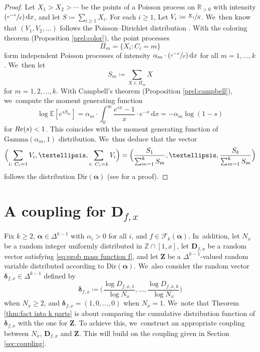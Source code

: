 \documentclass[10pt,a4paper]{amsart}
\newcommand{\bD}{{\boldsymbol D}}
\newcommand{\bZ}{{\boldsymbol Z}}
\newcommand{\Psfrac}[2]{(\sfrac{#1}{#2})}
\newcommand{\ZZ}{\mathbb{Z}}
\newcommand{\RR}{\mathbb{R}}
\newcommand{\EE}{\mathbb{E}}
\newcommand{\boldalpha}{\boldsymbol{\alpha}}
\newcommand{\bolddelta}{\boldsymbol{\delta}}
\newcommand{\riemint}[4]{\int_{#1}^{#2}\! #3 \, \mathrm{d}#4}
\renewcommand{\Re}{\textup{Re}}
\newcommand{\simplex}{\Delta^{k-1}}
\newcommand{\bgg}{\Big}
\theoremstyle{plain}
\theoremstyle{definition}
\begin{document}
\begin{proof}
Let $X_1 > X_2 > \cdots$ be the points of a Poisson process on $\RR_{>0}$ with intensity $\Psfrac{e^{-x}}{x} \, \mathrm dx$, and let $S \coloneqq \sum_{i \ge 1} X_i$. For each $i \ge 1$, Let $V_i \coloneqq \sfrac{X_i}{S}$. We~then know that $(V_1, V_2, \ldots)$ follows the Poisson--Dirichlet distribution \cite[Th.\,2.2]{Feng10}. With the coloring theorem (Proposition \ref{prel:color}), the point processes
\[
\Pi_m = \{X_i : C_i = m\}
\]
form independent Poisson processes of intensity $\alpha_m\cdot \Psfrac{e^{-x}}{x} \, \mathrm dx$ for all $m = 1, \ldots, k$. We~then let
\[
S_m \coloneqq \sum_{X \in \Pi_m} X
\]
for $m=1,2,\dots,k$. With Campbell's theorem (Proposition \ref{prel:campbell}), we~compute the moment generating function
\[
\log \EE[e^{sS_m}] = \alpha_m\cdot \riemint{0}{\infty}{\frac{e^{sx}-1}{x}\cdot e^{-x}}{x} = -\alpha_m\log(1-s)
\]
for $\Re(s) < 1$. This coincides with the moment generating function of $\text{Gamma}(\alpha_m, 1)$ distribution. We~thus deduce that the vector
\[
\Bigl(\sum_{i:\ C_i = 1} V_i, \ldots, \sum_{i:\ C_i = k} V_i \Bigr) = \Bigl(\frac{S_1}{\sum_{m=1}^k S_m}, \ldots, \frac{S_k}{\sum_{m=1}^k S_m} \Bigr)
\]
follows the distribution $\text{Dir}(\boldalpha)$ (see \cite[Ch.\,49, pp.\,485-487]{KotzBal00} for a proof).
\end{proof}

\section{A coupling for \texorpdfstring{$\bD_{f, x}$}{bD}}\label{sec:coupling for factorizations}

Fix $k\ge2$, $\boldalpha \in \simplex$ with $\alpha_i>0$ for all $i$, and $f\in\mathcal{F}_k(\boldalpha)$. In~addition, let $N_x$ be a random integer uniformly distributed in $\ZZ \cap [1, x]$, let $\bD_{f, x}$ be a random vector satisfying \eqref{eq:prob mass function f}, and let $\bZ$ be a $\simplex$-valued random variable distributed according to $\text{Dir}(\boldalpha)$. We~also consider the random vector $\bolddelta_{f, x} \in \Delta^{k-1}$ defined by
\begin{equation}
\label{eq:defn delta}
\bolddelta_{f, x} \coloneqq \bgg(\frac{\log D_{f,x,1}}{\log N_x},\dots,\frac{\log D_{f,x,k}}{\log N_x}\bgg)
\end{equation}
when $N_x \ge 2$, and $\bolddelta_{f,x} = (1,0,\ldots,0)$ when $N_x = 1$. We~note that Theorem \ref{thm:fact into k parts} is about comparing the cumulative distribution function of $\bolddelta_{f, x}$ with the one for $\bZ$. To achieve this, we~construct an appropriate coupling between $N_x$, $\bD_{f, x}$ and $\bZ$. This will build on the coupling given in Section \ref{sec:coupling}.
\end{document}

